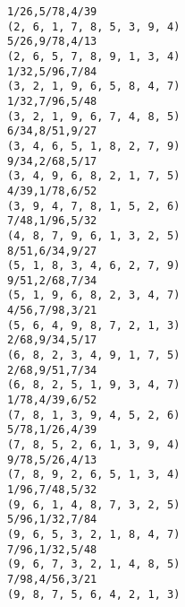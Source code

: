 \documentclass[11pt]{article}
\begin{document}
    \begin{Verbatim}[commandchars=\\\{\}]
1/26,5/78,4/39
(2, 6, 1, 7, 8, 5, 3, 9, 4)
5/26,9/78,4/13
(2, 6, 5, 7, 8, 9, 1, 3, 4)
1/32,5/96,7/84
(3, 2, 1, 9, 6, 5, 8, 4, 7)
1/32,7/96,5/48
(3, 2, 1, 9, 6, 7, 4, 8, 5)
6/34,8/51,9/27
(3, 4, 6, 5, 1, 8, 2, 7, 9)
9/34,2/68,5/17
(3, 4, 9, 6, 8, 2, 1, 7, 5)
4/39,1/78,6/52
(3, 9, 4, 7, 8, 1, 5, 2, 6)
7/48,1/96,5/32
(4, 8, 7, 9, 6, 1, 3, 2, 5)
8/51,6/34,9/27
(5, 1, 8, 3, 4, 6, 2, 7, 9)
9/51,2/68,7/34
(5, 1, 9, 6, 8, 2, 3, 4, 7)
4/56,7/98,3/21
(5, 6, 4, 9, 8, 7, 2, 1, 3)
2/68,9/34,5/17
(6, 8, 2, 3, 4, 9, 1, 7, 5)
2/68,9/51,7/34
(6, 8, 2, 5, 1, 9, 3, 4, 7)
1/78,4/39,6/52
(7, 8, 1, 3, 9, 4, 5, 2, 6)
5/78,1/26,4/39
(7, 8, 5, 2, 6, 1, 3, 9, 4)
9/78,5/26,4/13
(7, 8, 9, 2, 6, 5, 1, 3, 4)
1/96,7/48,5/32
(9, 6, 1, 4, 8, 7, 3, 2, 5)
5/96,1/32,7/84
(9, 6, 5, 3, 2, 1, 8, 4, 7)
7/96,1/32,5/48
(9, 6, 7, 3, 2, 1, 4, 8, 5)
7/98,4/56,3/21
(9, 8, 7, 5, 6, 4, 2, 1, 3)

    \end{Verbatim}


    
    
    
    
\end{document}
